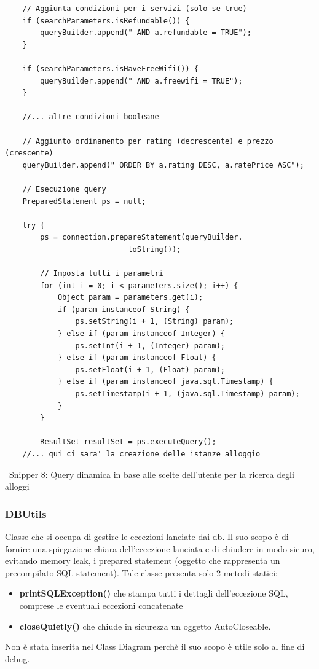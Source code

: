 \documentclass[10pt]{article}
\begin{document}
\begin{lstlisting}
    // Aggiunta condizioni per i servizi (solo se true)
    if (searchParameters.isRefundable()) {
        queryBuilder.append(" AND a.refundable = TRUE");
    }

    if (searchParameters.isHaveFreeWifi()) {
        queryBuilder.append(" AND a.freewifi = TRUE");
    }

    //... altre condizioni booleane

    // Aggiunto ordinamento per rating (decrescente) e prezzo (crescente)
    queryBuilder.append(" ORDER BY a.rating DESC, a.ratePrice ASC");

    // Esecuzione query
    PreparedStatement ps = null;

    try {
        ps = connection.prepareStatement(queryBuilder.
                            toString());

        // Imposta tutti i parametri
        for (int i = 0; i < parameters.size(); i++) {
            Object param = parameters.get(i);
            if (param instanceof String) {
                ps.setString(i + 1, (String) param);
            } else if (param instanceof Integer) {
                ps.setInt(i + 1, (Integer) param);
            } else if (param instanceof Float) {
                ps.setFloat(i + 1, (Float) param);
            } else if (param instanceof java.sql.Timestamp) {
                ps.setTimestamp(i + 1, (java.sql.Timestamp) param);
            }
        }

        ResultSet resultSet = ps.executeQuery();
    //... qui ci sara' la creazione delle istanze alloggio
\end{lstlisting}
\begin{center}
\par\
Snipper 8: Query dinamica in base alle scelte dell'utente per la ricerca degli alloggi
\par\medskip
\end{center}
\subsubsection{DBUtils}
Classe che si occupa di gestire le eccezioni lanciate dai db. Il suo scopo \`e di fornire una spiegazione chiara dell'eccezione lanciata e di chiudere in modo sicuro, evitando memory leak, i prepared statement (oggetto che rappresenta un precompilato SQL statement). Tale classe presenta solo 2 metodi statici:
\begin{itemize}
    \item \textbf{printSQLException()} che stampa tutti i dettagli dell'eccezione SQL, comprese le eventuali eccezioni concatenate  
    \item \textbf{closeQuietly()} che chiude in sicurezza un oggetto AutoCloseable.
\end{itemize}
Non \`e stata inserita nel Class Diagram perch\`e il suo scopo \`e utile solo al fine di debug.
\end{document}
